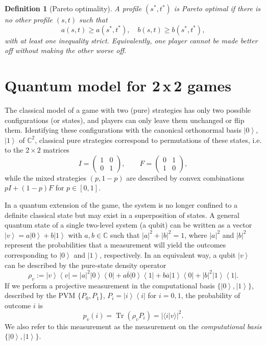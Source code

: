 \documentclass[11pt,a4paper,twoside]{article}
\DeclareMathOperator{\Tr}{Tr}
\newcommand{\kb}[2]{\left| #1 \right\rangle \! \left\langle #2 \right|} %
\newcommand{\ket}[1]{\left| #1 \right\rangle} %
\newcommand{\scalar}[2]{\langle #1 | #2\rangle} %
\newtheorem{definition}{Definition}
\begin{document}
\begin{definition}[Pareto optimality]
A profile \((s^*,t^*)\) is \emph{Pareto optimal} if there is no other profile \((s,t)\) such that
\[
a(s,t)\ge a(s^*,t^*),\quad b(s,t)\ge b(s^*,t^*),
\]
with at least one inequality strict.  
Equivalently, one player cannot be made better off without making the other worse off.
\end{definition}


\section{Quantum model for 2\,x\,2 games}


The classical model of a game with two (pure) strategies has only two possible configurations (or states), and players can only leave them unchanged or flip them. Identifying these configurations with the canonical orthonormal basis $\ket{0}$, $\ket{1}$ of $\mathbb{C}^2$, classical pure strategies correspond to permutations of these states, i.e. to the $2\times 2$ matrices 
$$I=\left(\begin{array}{cc}
1&0\\
0&1
\end{array}\right),\qquad F=\left(\begin{array}{cc}
0&1\\
1&0
\end{array}\right),
$$
while the mixed strategies $(p,1-p)$ are described by convex combinations $pI+(1-p)F$ for $p\in[0,1]$.

In a quantum extension of the game, the system is no longer confined to a definite classical state but may exist in a superposition of states. A general quantum state of a single two-level system (a qubit) can be written as a vector $\ket{v}=a\ket{0}+b\ket{1}$ with $a,b\in\mathbb{C}$ such that $|a|^2+|b|^2=1$, where $|a|^2$ and $|b|^2$ represent the probabilities that a measurement will yield the outcomes corresponding to $\ket{0}$ and $\ket{1}$, respectively. In an equivalent way, a qubit $\ket{v}$ can be described by the pure-state density operator $$\rho_v:=\kb{v}{v}=|a|^2\kb{0}{0}+a\overline{b}\kb{0}{1}+b\overline{a}\kb{1}{0}+|b|^2\kb{1}{1}.$$
If we perform a projective measurement in the computational basis $\{\ket{0},\ket{1}\}$, described by the PVM $\{P_0, P_1\}$, $P_i=\kb{i}{i}$ for $i=0,1$, the probability of outcome $i$ is 
$$p_v(i)=\Tr(\rho_v P_i)=|\scalar{i}{v}|^2.$$ We also refer to this measurement as the measurement on the \emph{computational basis} $\{\ket{0}, \ket{1}\}$.
\end{document}
